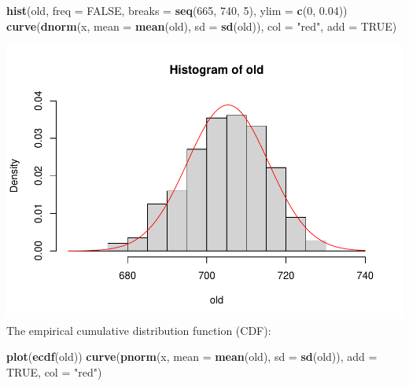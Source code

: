 \documentclass[
]{article}
\newenvironment{Shaded}{\begin{snugshade}}{\end{snugshade}}
\newcommand{\AttributeTok}[1]{\textcolor[rgb]{0.13,0.29,0.53}{#1}}
\newcommand{\ConstantTok}[1]{\textcolor[rgb]{0.56,0.35,0.01}{#1}}
\newcommand{\DecValTok}[1]{\textcolor[rgb]{0.00,0.00,0.81}{#1}}
\newcommand{\FloatTok}[1]{\textcolor[rgb]{0.00,0.00,0.81}{#1}}
\newcommand{\FunctionTok}[1]{\textcolor[rgb]{0.13,0.29,0.53}{\textbf{#1}}}
\newcommand{\NormalTok}[1]{#1}
\newcommand{\StringTok}[1]{\textcolor[rgb]{0.31,0.60,0.02}{#1}}
\begin{document}
\begin{Shaded}
\begin{Highlighting}[]
\FunctionTok{hist}\NormalTok{(old, }\AttributeTok{freq =} \ConstantTok{FALSE}\NormalTok{, }\AttributeTok{breaks =} \FunctionTok{seq}\NormalTok{(}\DecValTok{665}\NormalTok{, }\DecValTok{740}\NormalTok{, }\DecValTok{5}\NormalTok{), }\AttributeTok{ylim =} \FunctionTok{c}\NormalTok{(}\DecValTok{0}\NormalTok{, }\FloatTok{0.04}\NormalTok{))}
\FunctionTok{curve}\NormalTok{(}\FunctionTok{dnorm}\NormalTok{(x, }\AttributeTok{mean =} \FunctionTok{mean}\NormalTok{(old), }\AttributeTok{sd =} \FunctionTok{sd}\NormalTok{(old)), }\AttributeTok{col =} \StringTok{"red"}\NormalTok{, }\AttributeTok{add =} \ConstantTok{TRUE}\NormalTok{)}
\end{Highlighting}
\end{Shaded}

\includegraphics{EDA_files/figure-latex/unnamed-chunk-19-1.pdf} The
empirical cumulative distribution function (CDF):

\begin{Shaded}
\begin{Highlighting}[]
\FunctionTok{plot}\NormalTok{(}\FunctionTok{ecdf}\NormalTok{(old))}
\FunctionTok{curve}\NormalTok{(}\FunctionTok{pnorm}\NormalTok{(x, }\AttributeTok{mean =} \FunctionTok{mean}\NormalTok{(old), }\AttributeTok{sd =} \FunctionTok{sd}\NormalTok{(old)), }\AttributeTok{add =} \ConstantTok{TRUE}\NormalTok{, }\AttributeTok{col =} \StringTok{"red"}\NormalTok{)}
\end{Highlighting}
\end{Shaded}
\end{document}
